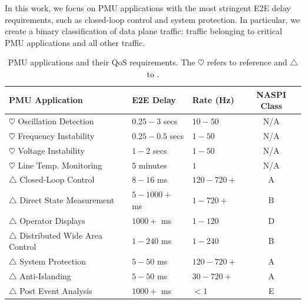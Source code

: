 In this work, we focus on PMU applications with the most stringent E2E delay requirements, such as closed-loop control and system protection. 
In particular, we create a binary classification of data plane traffic: traffic belonging to critical PMU applications and all other traffic. 



\begin{table}[t]
\begin{center}
\begin{tabular}{|l|l|l|c|} 
\hline
   	{\bf PMU Application} & {\bf E2E Delay} & {\bf Rate (Hz)} & {\bf NASPI Class} \\ 
		  \hline \hline
		
			$\heartsuit$ Oscillation Detection & $0.25 - 3$ secs & $10-50$  & N/A \\
			$\heartsuit$  Frequency Instability & $0.25-0.5$ secs & $1-50$ & N/A  \\
			$\heartsuit$  Voltage Instability & $1-2$ secs &  $1-50$  & N/A  \\
			$\heartsuit$  Line Temp. Monitoring & $5$ minutes & $1$ & N/A  \\
			\hline
			$\triangle$ Closed-Loop Control & $8-16$ ms & $120-720+$ & A \\ 
			$\triangle$  Direct State Measurement & $5-1000+$ ms & $1-720+$  & B \\
			$\triangle$ Operator Displays & $1000+$ ms & $1-120$ & D \\
			$\triangle$ Distributed Wide Area Control & $1-240$ ms & $1-240$  & B  \\
			$\triangle$ System Protection & $5-50$ ms & $120-720+$  & A  \\
			$\triangle$  Anti-Islanding & $5-50$ ms & $30-720+$  & A  \\
			$\triangle$  Post Event Analysis & $1000+$ ms & $< 1$ & E \\
			\hline
			\end{tabular}
			\end{center}
\caption{PMU applications and their QoS requirements.  The $\heartsuit$ refers to reference \cite{Kth09} and $\triangle$ to \cite{Bakken11}. }
\label{tab:app-requirements}
\end{table}

